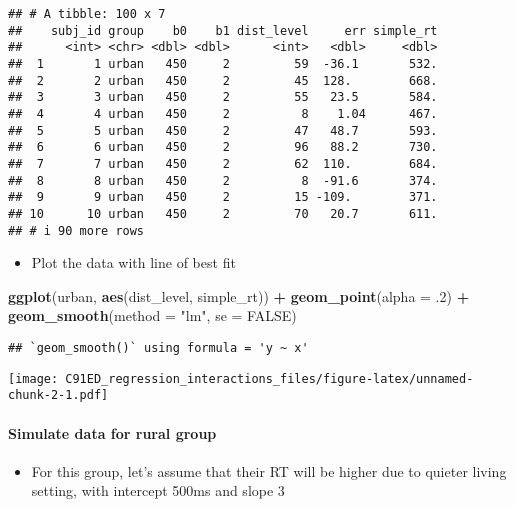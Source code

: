 \documentclass[
]{article}
\newenvironment{Shaded}{\begin{snugshade}}{\end{snugshade}}
\newcommand{\AttributeTok}[1]{\textcolor[rgb]{0.13,0.29,0.53}{#1}}
\newcommand{\ConstantTok}[1]{\textcolor[rgb]{0.56,0.35,0.01}{#1}}
\newcommand{\DecValTok}[1]{\textcolor[rgb]{0.00,0.00,0.81}{#1}}
\newcommand{\FunctionTok}[1]{\textcolor[rgb]{0.13,0.29,0.53}{\textbf{#1}}}
\newcommand{\NormalTok}[1]{#1}
\newcommand{\SpecialCharTok}[1]{\textcolor[rgb]{0.81,0.36,0.00}{\textbf{#1}}}
\newcommand{\StringTok}[1]{\textcolor[rgb]{0.31,0.60,0.02}{#1}}
\providecommand{\tightlist}{%
  \setlength{\itemsep}{0pt}\setlength{\parskip}{0pt}}
\begin{document}
\begin{verbatim}
## # A tibble: 100 x 7
##    subj_id group    b0    b1 dist_level     err simple_rt
##      <int> <chr> <dbl> <dbl>      <int>   <dbl>     <dbl>
##  1       1 urban   450     2         59  -36.1       532.
##  2       2 urban   450     2         45  128.        668.
##  3       3 urban   450     2         55   23.5       584.
##  4       4 urban   450     2          8    1.04      467.
##  5       5 urban   450     2         47   48.7       593.
##  6       6 urban   450     2         96   88.2       730.
##  7       7 urban   450     2         62  110.        684.
##  8       8 urban   450     2          8  -91.6       374.
##  9       9 urban   450     2         15 -109.        371.
## 10      10 urban   450     2         70   20.7       611.
## # i 90 more rows
\end{verbatim}

\begin{itemize}
\tightlist
\item
  Plot the data with line of best fit
\end{itemize}

\begin{Shaded}
\begin{Highlighting}[]
\FunctionTok{ggplot}\NormalTok{(urban, }\FunctionTok{aes}\NormalTok{(dist\_level, simple\_rt)) }\SpecialCharTok{+} 
  \FunctionTok{geom\_point}\NormalTok{(}\AttributeTok{alpha =}\NormalTok{ .}\DecValTok{2}\NormalTok{) }\SpecialCharTok{+}
  \FunctionTok{geom\_smooth}\NormalTok{(}\AttributeTok{method =} \StringTok{"lm"}\NormalTok{, }\AttributeTok{se =} \ConstantTok{FALSE}\NormalTok{)}
\end{Highlighting}
\end{Shaded}

\begin{verbatim}
## `geom_smooth()` using formula = 'y ~ x'
\end{verbatim}

\texttt{[image: C91ED\_regression\_interactions\_files/figure-latex/unnamed-chunk-2-1.pdf]}

\hypertarget{simulate-data-for-rural-group}{%
\paragraph{Simulate data for rural
group}\label{simulate-data-for-rural-group}}

\begin{itemize}
\tightlist
\item
  For this group, let's assume that their RT will be higher due to
  quieter living setting, with intercept 500ms and slope 3
\end{itemize}
\end{document}
